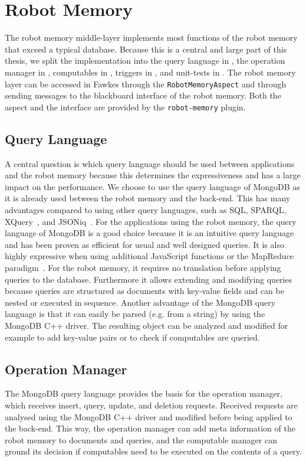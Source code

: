 \section{Robot Memory}
\label{sec:impl-memory}
The robot memory middle-layer implements most functions of the robot
memory that exceed a typical database. Because this is a central and
large part of this thesis, we split the implementation into the query
language in , the operation manager in
, computables in
, triggers in ,
and unit-tests in . The robot memory layer
can be accessed in Fawkes through the \texttt{RobotMemoryAspect} and
through sending messages to the blackboard interface of the robot
memory. Both the aspect and the interface are provided by the
\texttt{robot-memory} plugin.

\subsection{Query Language}
\label{sec:impl-query-language}
A central question is which query language should be used between
applications and the robot memory because this determines the
expressiveness and has a large impact on the performance. We choose to
use the query language of MongoDB as it is already used between the
robot memory and the back-end. This has many advantages compared to
using other query languages, such as SQL, SPARQL,
XQuery~\cite{query-languages}, and JSONiq~\cite{jsoniq}.  For the
applications using the robot memory, the query language of MongoDB is
a good choice because it is an intuitive query language and has been
proven as efficient for usual and well designed queries. It is also
highly expressive when using additional JavaScript functions or the
MapReduce paradigm~\cite{mongodb,RoboDB}. For the robot memory, it
requires no translation before applying queries to the
database. Furthermore it allows extending and modifying queries
because queries are structured as documents with key-value fields and
can be nested or executed in sequence. Another advantage of the
MongoDB query language is that it can easily be parsed (e.g. from a
string) by using the MongoDB C++ driver. The resulting object can be
analyzed and modified for example to add key-value pairs or to check
if computables are queried.

\subsection{Operation Manager}
\label{sec:impl-opmanager}
The MongoDB query language provides the basis for the operation
manager, which receives insert, query, update, and deletion
requests. Received requests are analysed using the MongoDB C++ driver
and modified before being applied to the back-end. This way, the
operation manager can add meta information of the robot memory to
documents and queries, and the computable manager can ground its
decision if computables need to be executed on the contents of a
query.

